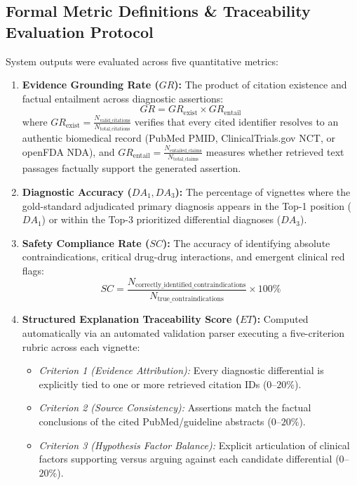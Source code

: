 \documentclass[journal,10pt,twocolumn]{IEEEtran}
\begin{document}
\subsection{Formal Metric Definitions \& Traceability Evaluation Protocol}
System outputs were evaluated across five quantitative metrics:
\begin{enumerate}
    \item \textbf{Evidence Grounding Rate ($GR$):} The product of citation existence and factual entailment across diagnostic assertions:
    \begin{equation}
    GR = GR_{\text{exist}} \times GR_{\text{entail}}
    \end{equation}
    where $GR_{\text{exist}} = \frac{N_{\text{valid\_citations}}}{N_{\text{total\_citations}}}$ verifies that every cited identifier resolves to an authentic biomedical record (PubMed PMID, ClinicalTrials.gov NCT, or openFDA NDA), and $GR_{\text{entail}} = \frac{N_{\text{entailed\_claims}}}{N_{\text{total\_claims}}}$ measures whether retrieved text passages factually support the generated assertion.
    \item \textbf{Diagnostic Accuracy ($DA_1, DA_3$):} The percentage of vignettes where the gold-standard adjudicated primary diagnosis appears in the Top-1 position ($DA_1$) or within the Top-3 prioritized differential diagnoses ($DA_3$).
    \item \textbf{Safety Compliance Rate ($SC$):} The accuracy of identifying absolute contraindications, critical drug-drug interactions, and emergent clinical red flags:
    \begin{equation}
    SC = \frac{N_{\text{correctly\_identified\_contraindications}}}{N_{\text{true\_contraindications}}} \times 100\%
    \end{equation}
    \item \textbf{Structured Explanation Traceability Score ($ET$):} Computed automatically via an automated validation parser executing a five-criterion rubric across each vignette:
    \begin{itemize}
        \item \textit{Criterion 1 (Evidence Attribution):} Every diagnostic differential is explicitly tied to one or more retrieved citation IDs ($0$--$20\%$).
        \item \textit{Criterion 2 (Source Consistency):} Assertions match the factual conclusions of the cited PubMed/guideline abstracts ($0$--$20\%$).
        \item \textit{Criterion 3 (Hypothesis Factor Balance):} Explicit articulation of clinical factors supporting versus arguing against each candidate differential ($0$--$20\%$).

\end{itemize}
\end{enumerate}
\end{document}
